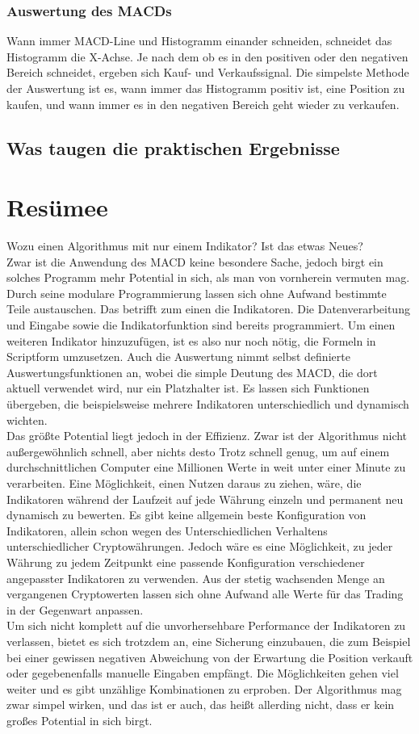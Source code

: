 \documentclass[12pt]{article}
\begin{document}
	\subsubsection{Auswertung des MACDs}
		Wann immer MACD-Line und Histogramm einander schneiden, schneidet das Histogramm die X-Achse. Je nach dem ob es in den positiven oder den negativen Bereich schneidet, ergeben sich Kauf- und Verkaufssignal. Die simpelste Methode der Auswertung ist es, wann immer das Histogramm positiv ist, eine Position zu kaufen, und wann immer es in den negativen Bereich geht wieder zu verkaufen.


\subsection{Was taugen die praktischen Ergebnisse}
\section{Resümee}
	Wozu einen Algorithmus mit nur einem Indikator? Ist das etwas Neues?\\
	Zwar ist die Anwendung des MACD keine besondere Sache, jedoch birgt ein solches Programm mehr Potential in sich, als man von vornherein vermuten mag. Durch seine modulare Programmierung lassen sich ohne Aufwand bestimmte Teile austauschen. Das betrifft zum einen die Indikatoren. Die Datenverarbeitung und Eingabe sowie die Indikatorfunktion sind bereits programmiert. Um einen weiteren Indikator hinzuzufügen, ist es also nur noch nötig, die Formeln in Scriptform umzusetzen. Auch die Auswertung nimmt selbst definierte Auswertungsfunktionen an, wobei die simple Deutung des MACD, die dort aktuell verwendet wird, nur ein Platzhalter ist. Es lassen sich Funktionen übergeben, die beispielsweise mehrere Indikatoren unterschiedlich und dynamisch wichten.\\
	Das größte Potential liegt jedoch in der Effizienz. Zwar ist der Algorithmus nicht außergewöhnlich schnell, aber nichts desto Trotz schnell genug, um auf einem durchschnittlichen Computer eine Millionen Werte in weit unter einer Minute zu verarbeiten. Eine Möglichkeit, einen Nutzen daraus zu ziehen, wäre, die Indikatoren während der Laufzeit auf jede Währung einzeln und permanent neu dynamisch zu bewerten. Es gibt keine allgemein beste Konfiguration von Indikatoren, allein schon wegen des Unterschiedlichen Verhaltens unterschiedlicher Cryptowährungen. Jedoch wäre es eine Möglichkeit, zu jeder Währung zu jedem Zeitpunkt eine passende Konfiguration verschiedener angepasster Indikatoren zu verwenden. Aus der stetig wachsenden Menge an vergangenen Cryptowerten lassen sich ohne Aufwand alle Werte für das Trading in der Gegenwart anpassen.\\
	Um sich nicht komplett auf die unvorhersehbare Performance der Indikatoren zu verlassen, bietet es sich trotzdem an, eine Sicherung einzubauen, die zum Beispiel bei einer gewissen negativen Abweichung von der Erwartung die Position verkauft oder gegebenenfalls manuelle Eingaben empfängt. Die Möglichkeiten gehen viel weiter und es gibt unzählige Kombinationen zu erproben. Der Algorithmus mag zwar simpel wirken, und das ist er auch, das heißt allerding nicht, dass er kein großes Potential in sich birgt.
\end{document}
